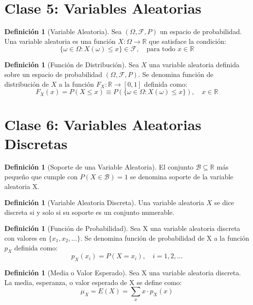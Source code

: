 \documentclass[11pt]{article}
\theoremstyle{definition} %
\newtheorem{definition}[theorem]{Definición}
\begin{document}

\section{Clase 5: Variables Aleatorias}

\begin{definition}[Variable Aleatoria]
Sea $(\Omega, \mathcal{F}, P)$ un espacio de probabilidad. Una variable aleatoria es una función $X: \Omega \to \mathbb{R}$ que satisface la condición:
$$ \{\omega \in \Omega : X(\omega) \le x\} \in \mathcal{F}, \quad \text{para todo } x \in \mathbb{R} $$
\end{definition}

\begin{definition}[Función de Distribución]
Sea $X$ una variable aleatoria definida sobre un espacio de probabilidad $(\Omega, \mathcal{F}, P)$. Se denomina función de distribución de $X$ a la función $F_{X}: \mathbb{R} \to [0,1]$ definida como:
$$ F_{X}(x) = P(X \le x) \equiv P(\{\omega \in \Omega : X(\omega) \le x\}), \quad x \in \mathbb{R} $$
\end{definition}


\section{Clase 6: Variables Aleatorias Discretas}

\begin{definition}[Soporte de una Variable Aleatoria]
El conjunto $\mathcal{B} \subseteq \mathbb{R}$ más pequeño que cumple con $P(X \in \mathcal{B}) = 1$ se denomina soporte de la variable aleatoria X.
\end{definition}

\begin{definition}[Variable Aleatoria Discreta]
Una variable aleatoria $X$ se dice discreta si y solo si su soporte es un conjunto numerable.
\end{definition}

\begin{definition}[Función de Probabilidad]
Sea X una variable aleatoria discreta con valores en $\{x_{1}, x_{2}, \dots\}$. Se denomina función de probabilidad de X a la función $p_X$ definida como:
$$ p_{X}(x_{i}) = P(X = x_{i}), \quad i=1, 2, \dots $$
\end{definition}

\begin{definition}[Media o Valor Esperado]
Sea X una variable aleatoria discreta. La media, esperanza, o valor esperado de X se define como:
$$ \mu_{X} = E(X) = \sum_{x} x \cdot p_{X}(x) $$
\end{definition}
\end{document}
